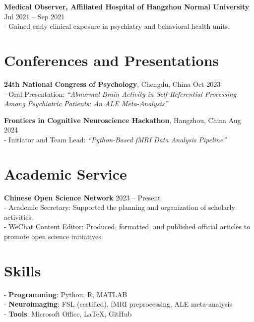 \documentclass[11pt,a4paper]{article}
\begin{document}
\textbf{Medical Observer, Affiliated Hospital of Hangzhou Normal University} \hfill Jul 2021 -- Sep 2021 \\
- Gained early clinical exposure in psychiatry and behavioral health units.

\vspace{0.5cm}

\section*{Conferences and Presentations}

\textbf{24th National Congress of Psychology}, Chengdu, China \hfill Oct 2023 \\
- Oral Presentation: \textit{``Abnormal Brain Activity in Self-Referential Processing Among Psychiatric Patients: An ALE Meta-Analysis''}

\textbf{Frontiers in Cognitive Neuroscience Hackathon}, Hangzhou, China \hfill Aug 2024 \\
- Initiator and Team Lead: \textit{``Python-Based fMRI Data Analysis Pipeline''}

\vspace{0.5cm}

\section*{Academic Service}

\textbf{Chinese Open Science Network} \hfill 2023 -- Present \\
- Academic Secretary: Supported the planning and organization of scholarly activities. \\
- WeChat Content Editor: Produced, formatted, and published official articles to promote open science initiatives.

\vspace{0.5cm}

\section*{Skills}

- \textbf{Programming}: Python, R, MATLAB \\
- \textbf{Neuroimaging}: FSL (certified), fMRI preprocessing, ALE meta-analysis \\
- \textbf{Tools}: Microsoft Office, LaTeX, GitHub
\end{document}
